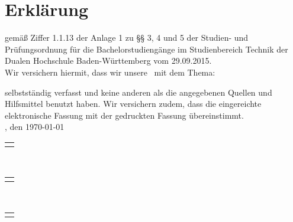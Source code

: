 
\chapter*{Erklärung}

gemäß Ziffer 1.1.13 der Anlage 1 zu §§ 3, 4 und 5  der Studien- und Prüfungsordnung für die Bachelorstudiengänge im Studienbereich Technik der Dualen Hochschule Baden-Württemberg vom 29.09.2015.\\[1em]
Wir versichern hiermit, dass wir unsere \mytypeofwork\ mit dem Thema:
\vspace{24pt}
\begin{large}
\begin{center}
	\textbf{\mytitle}
\end{center}
\end{large}
\vspace{24pt}
selbstständig verfasst und keine anderen als die angegebenen Quellen und Hilfsmittel benutzt haben. Wir versichern zudem, dass die eingereichte elektronische Fassung mit der gedruckten Fassung übereinstimmt.\\[2em]
\myplace, den \today\\[6em]
\begin{raggedright}
	\begin{tabular}[h]{p{7cm}}
		\cline{1-1}
		\myauthora\\
	\end{tabular}
\end{raggedright}\\[4em]

\begin{raggedright}
	\begin{tabular}[h]{p{7cm}}
		\cline{1-1}
		\myauthorb\\
	\end{tabular}
\end{raggedright}\\[4em]

\begin{raggedright}
	\begin{tabular}[h]{p{7cm}}
		\cline{1-1}
		\myauthorc\\
	\end{tabular}
\end{raggedright}

\clearpage
